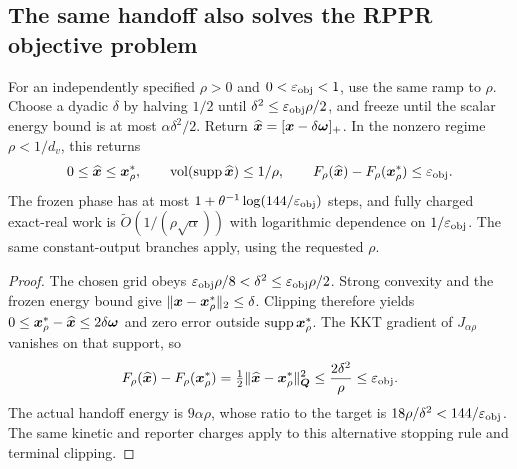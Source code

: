 \subsection{The same handoff also solves the RPPR objective problem}
\begin{corollary}
\label{cor:revisit-rppr}
For an independently specified $\rho>0$ and $0<\varepsilon_{\mathrm{obj}}<1$, use the
same ramp to $\rho$. Choose a dyadic $\delta$ by halving $1/2$ until
$\delta^2\leq\varepsilon_{\mathrm{obj}}\rho/2$, and freeze until the scalar energy bound
is at most $\alpha\delta^2/2$. Return
$\widehat{\bm{x}}=[\bm{x}-\delta\bm{\omega}]_+$. In the nonzero regime
$\rho<1/d_v$, this returns
\[
 0\leq\widehat{\bm{x}}\leq\bm{x}_\rho^*,\qquad
 \operatorname{vol}(\operatorname{supp}\widehat{\bm{x}})\leq1/\rho,\qquad
 F_\rho(\widehat{\bm{x}})-F_\rho(\bm{x}_\rho^*)\leq\varepsilon_{\mathrm{obj}}.
\]
The frozen phase has at most
$1+\theta^{-1}\log(144/\varepsilon_{\mathrm{obj}})$ steps, and fully charged exact-real
work is $\widetilde O(1/(\rho\sqrt\alpha))$ with logarithmic dependence
on $1/\varepsilon_{\mathrm{obj}}$. The same constant-output branches apply, using the
requested $\rho$.
\end{corollary}
\begin{proof}
The chosen grid obeys
$\varepsilon_{\mathrm{obj}}\rho/8<\delta^2\leq\varepsilon_{\mathrm{obj}}\rho/2$.
Strong convexity and the frozen energy bound give
$\|\bm{x}-\bm{x}_\rho^*\|_2\leq\delta$.
Clipping therefore yields
$0\leq\bm{x}_\rho^*-\widehat{\bm{x}}\leq2\delta\bm{\omega}$ and zero error
outside $\operatorname{supp}\bm{x}_\rho^*$.
The KKT gradient of $J_{\alpha\rho}$ vanishes on that support, so
\[
 F_\rho(\widehat{\bm{x}})-F_\rho(\bm{x}_\rho^*)
 =\tfrac12\|\widehat{\bm{x}}-\bm{x}_\rho^*\|_{\bm{Q}}^2
 \leq\frac{2\delta^2}{\rho}\leq\varepsilon_{\mathrm{obj}}.
\]
The actual handoff energy is $9\alpha\rho$, whose ratio to the target
is $18\rho/\delta^2<144/\varepsilon_{\mathrm{obj}}$. The same kinetic and reporter charges
apply to this alternative stopping rule and terminal clipping.
\end{proof}

